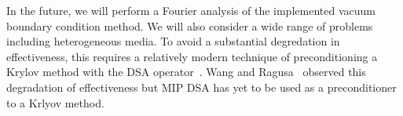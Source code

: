 \documentclass[12pt]{article}
\begin{document}
In the future, we will perform a Fourier analysis of the implemented vacuum boundary condition method. We will also consider a wide range of problems including heterogeneous media. To avoid a substantial degredation in effectiveness, this requires a relatively modern technique of preconditioning a Krylov method with the DSA operator~\cite{WarsaKrylovDSA}. Wang and Ragusa~\cite{WangRagusaDSA} observed this degradation of effectiveness but MIP DSA has yet to be used as a preconditioner to a Krlyov method.

%
%
\end{document}

